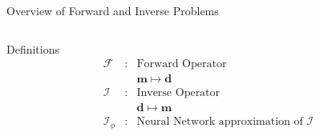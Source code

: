 \begin{frame}{Overview of Forward and Inverse Problems}
\begin{columns}
\begin{column}{0.55\textwidth}
\vspace{0,15cm}
\begin{block}{Definitions}
\begin{equation*}
  \begin{array}{cll}
    \mathcal{F} &: & \text{Forward Operator} \\
    & & \boldsymbol{m} \mapsto \boldsymbol{d} \\[2mm]
   \mathcal{I} &: & \text{Inverse Operator} \\
    & & \boldsymbol{d} \mapsto \boldsymbol{m} \\[2mm]
    \mathcal{I}_{\phi} &: & \text{Neural Network approximation of } \mathcal{I}
  \end{array}
\end{equation*}
\end{block}

\end{column}
\end{columns}
\end{frame}

